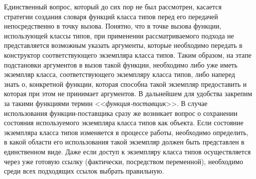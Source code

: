 % 


Единственный вопрос, который до сих пор не был рассмотрен, касается стратегии создания словаря функций класса типов перед его передачей непосредственно в точку вызова. Понятно, что в точке вызова функции, использующей классы типов, при применении рассматриваемого подхода не представляется возможным указать аргументы, которые необходимо передать в конструктор соответствующего экземпляра класса типов. Таким образом, на этапе подстановки аргументов в вызов такой функции, необходимо либо уже иметь экземпляр класса, соответствующего экземпляру класса типов, либо наперед знать о, конкретной функции, которая способна такой экземпляр предоставить и которая при этом не принимает аргументов. В дальнейшем для удобства закрепим за такими функциями термин <<\emph{функция-поставщик}>>. В случае использования функции-поставщика сразу же возникает вопрос о сохранении состояния используемого экземпляра класса типов как объекта. Если состояние экземпляра класса типов изменяется в процессе работы, необходимо определить, в какой области его использования такой экземпляр должен быть представлен в единственном виде. Даже если доступ к экземпляру класса типов осуществляется через уже готовую ссылку (фактически, посредством переменной), необходимо среди всех подходящих ссылок выбрать правильную.

